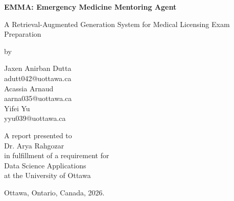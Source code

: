 \pagestyle{empty}

\begin{titlepage}
        \begin{center}
        \vspace*{1.25cm}

        \Huge
        {
        \bf 
        EMMA: Emergency Medicine Mentoring Agent \\
        }

        \LARGE
        {A Retrieval-Augmented Generation System for Medical Licensing Exam Preparation}

        \vspace*{2.5cm}

        \normalsize
        by \\

        \vspace*{1.0cm}

        \Large
        Jaxen Anirban Dutta \\
        \normalsize
        adutt042@uottawa.ca \\

        \Large
        Acassia Arnaud \\
        \normalsize
        aarna035@uottawa.ca \\

        \Large
        Yifei Yu \\
        \normalsize
        yyu039@uottawa.ca \\

        \vspace*{1.75cm}

        A report presented to \\
        Dr. Arya Rahgozar \\ 
        in fulfillment of a requirement for \\
        Data Science Applications \\
        at the University of Ottawa \\

        \vspace*{0.75cm}

        Ottawa, Ontario, Canada, 2026. \\
        
        \end{center}
\end{titlepage}

